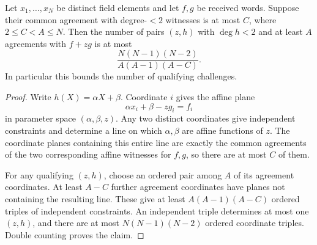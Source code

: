 \begin{proposition}
\label{prop:affine-witness-triple-packing}
Let $x_1,\ldots,x_N$ be distinct field elements and let $f,g$ be
received words. Suppose their common agreement with degree-$<2$
witnesses is at most $C$, where $2\le C<A\le N$.
Then the number of pairs $(z,h)$ with $\deg h<2$ and at least $A$
agreements with $f+zg$ is at most
\[
 \frac{N(N-1)(N-2)}{A(A-1)(A-C)}.
\]
In particular this bounds the number of qualifying challenges.
\end{proposition}
\begin{proof}
Write $h(X)=\alpha X+\beta$. Coordinate $i$ gives the affine plane
\[
 \alpha x_i+\beta-zg_i=f_i
\]
in parameter space $(\alpha,\beta,z)$. Any two distinct coordinates
give independent constraints and determine a line on which
$\alpha,\beta$ are affine functions of $z$. The coordinate planes
containing this entire line are exactly the common agreements of
the two corresponding affine witnesses for $f,g$, so there are at
most $C$ of them.

For any qualifying $(z,h)$, choose an ordered pair among $A$ of its
agreement coordinates. At least $A-C$ further agreement coordinates
have planes not containing the resulting line. These give at least
$A(A-1)(A-C)$ ordered triples of independent constraints. An independent
triple determines at most one $(z,h)$, and there are at most
$N(N-1)(N-2)$ ordered coordinate triples. Double counting proves the claim.
\end{proof}

